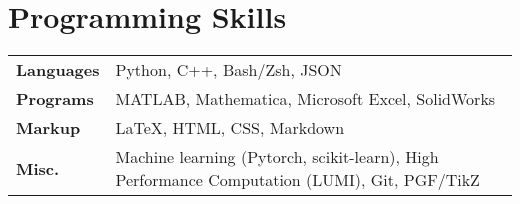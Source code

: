 \documentclass[a4paper,11pt]{article}
\begin{document}
\vspace{-1.5em}
\section{Programming Skills}
\begin{tabularx}{\linewidth}{@{}l X@{}}
\textbf{Languages} & Python, C++, Bash/Zsh, JSON \\
\textbf{Programs} & MATLAB, Mathematica, Microsoft Excel, SolidWorks \\
\textbf{Markup} & \LaTeX, HTML, CSS, Markdown \\
\textbf{Misc.} & Machine learning (Pytorch, scikit-learn), High Performance Computation (LUMI), Git, PGF/TikZ
\end{tabularx}

\end{document}
